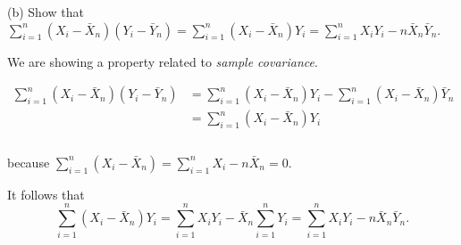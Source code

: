 \documentclass[
  11pt,
  ignorenonframetext,
]{beamer}
\begin{document}
\begin{frame}{(b) Show that
\(\sum_{i=1}^n \left(X_i - \bar{X}_n\right)\left(Y_i - \bar{Y}_n\right) = \sum_{i=1}^n \left(X_i - \bar{X}_n\right)Y_i = \sum_{i=1}^n X_i Y_i - n\bar{X}_n\bar{Y}_n\).}
\protect\hypertarget{b-show-that-sum_i1n-leftx_i---barx_nrightlefty_i---bary_nright-sum_i1n-leftx_i---barx_nrighty_i-sum_i1n-x_i-y_i---nbarx_nbary_n.}{}
\pause

We are showing a property related to \emph{sample covariance}.

\pause

\[
\begin{aligned}
\sum_{i=1}^n \left(X_i - \bar{X}_n\right)\left(Y_i - \bar{Y}_n\right) &= \sum_{i=1}^n \left(X_i - \bar{X}_n\right)Y_i - \sum_{i=1}^n \left(X_i - \bar{X}_n\right)\bar{Y}_n\\
&= \sum_{i=1}^n \left(X_i - \bar{X}_n\right)Y_i\\
\end{aligned}
\]\\
because
\(\sum_{i=1}^n\left(X_i - \bar{X}_n\right) = \sum_{i=1}^n X_i - n\bar{X}_n = 0\).

It follows that \[ 
\sum_{i=1}^n \left(X_i - \bar{X}_n\right)Y_i = \sum_{i=1}^n X_iY_i - \bar{X}_n\sum_{i=1}^nY_i = \sum_{i=1}^n X_iY_i - n\bar{X}_n\bar{Y}_n.
\]
\end{frame}
\end{document}
